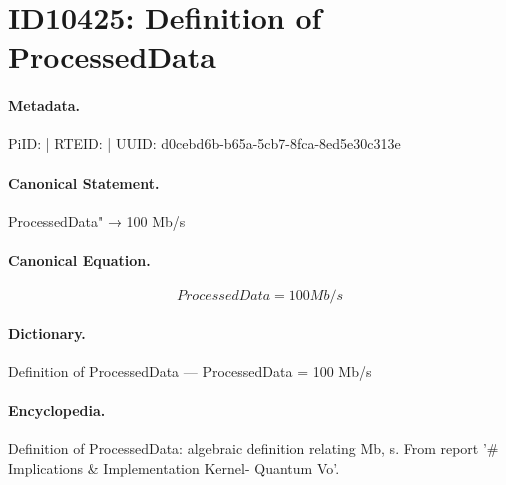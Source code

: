 \section*{ID10425: Definition of ProcessedData}
\paragraph{Metadata.}
PiID:  | RTEID:  | UUID: d0cebd6b-b65a-5cb7-8fca-8ed5e30c313e

\paragraph{Canonical Statement.}
ProcessedData" → 100 Mb/s

\paragraph{Canonical Equation.}
\[
ProcessedData = 100 Mb/s
\]

\paragraph{Dictionary.}
Definition of ProcessedData — ProcessedData = 100 Mb/s

\paragraph{Encyclopedia.}
Definition of ProcessedData: algebraic definition relating Mb, s. From report '\# Implications \& Implementation Kernel- Quantum Vo'.
